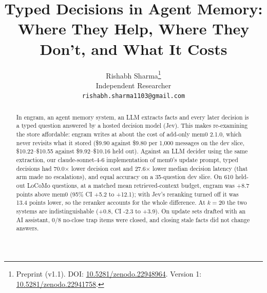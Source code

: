 \documentclass[11pt]{article}
\title{Typed Decisions in Agent Memory: Where They Help, Where They Don't, and What It Costs}
\author{Rishabh Sharma\thanks{Preprint (v1.1). DOI:
  \href{https://doi.org/10.5281/zenodo.22948964}{10.5281/zenodo.22948964}. Version 1:
  \href{https://doi.org/10.5281/zenodo.22941758}{10.5281/zenodo.22941758}.} \\
  Independent Researcher \\
  \texttt{rishabh.sharma1103@gmail.com}}
\newcommand{\src}[1]{}
\begin{document}
\maketitle
\begin{abstract}
In engram, an agent memory system, an LLM extracts facts and every later decision is a typed question answered by a hosted decision model (Jev). This makes re-examining the store affordable: engram writes at about the cost of add-only mem0 2.1.0, which never revisits what it stored (\$9.90\src{bench/results/e2\_jev\_\_dev.json} against \$9.80\src{bench/results/mem0\_\_dev.json} per 1,000 messages on the dev slice, \$10.22\src{bench/results/heldout\_report.json}--\$10.55\src{bench/results/heldout\_report.json} against \$9.92\src{bench/results/heldout\_report.json}--\$10.16\src{bench/results/heldout\_report.json} held out). Against an LLM decider using the same extraction, our claude-sonnet-4-6 implementation of mem0's update prompt, typed decisions had 70.0$\times$\src{bench/results/e2\_llm\_\_dev.json ÷ bench/results/e2\_jev\_\_dev.json} lower decision cost and 27.6$\times$\src{bench/results/e2\_llm\_\_dev.json ÷ bench/results/e2\_jev\_\_dev.json} lower median decision latency (that arm made no escalations), and equal accuracy on a 35\src{bench/results/e2\_jev\_\_dev.json}-question dev slice. On 610\src{bench/results/heldout\_report.json} held-out LoCoMo questions, at a matched mean retrieved-context budget, engram was +8.7\src{bench/results/mem0\_token\_matched\_\_heldout\_pooled\_\_k6.json} points above mem0 (95\% CI +5.2\src{bench/results/mem0\_token\_matched\_\_heldout\_pooled\_\_k6.json} to +12.1\src{bench/results/mem0\_token\_matched\_\_heldout\_pooled\_\_k6.json}); with Jev's reranking turned off it was 13.4\src{bench/results/heldout\_extra.json} points lower, so the reranker accounts for the whole difference. At $k{=}$20 the two systems are indistinguishable (+0.8\src{bench/results/heldout\_report.json}, CI -2.3\src{bench/results/heldout\_report.json} to +3.9\src{bench/results/heldout\_report.json}). On update sets drafted with an AI assistant, 0/8\src{bench/results/e4\_belief\_v2\_\_dev\_updates\_\_k3.json} no-close trap items were closed, and closing stale facts did not change answers.

\end{abstract}
\end{document}
